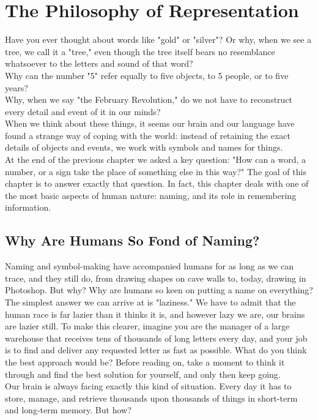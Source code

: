 \chapter{The Philosophy of Representation}
\label{ch:philosophy-of-representation}

Have you ever thought about words like "gold" or "silver"? Or why, when we see a tree, we call it a "tree," even though the tree itself bears no resemblance whatsoever to the letters and sound of that word?\\
Why can the number "5" refer equally to five objects, to 5 people, or to five years?\\
Why, when we say "the February Revolution," do we not have to reconstruct every detail and event of it in our minds?\\
When we think about these things, it seems our brain and our language have found a strange way of coping with the world: instead of retaining the exact details of objects and events, we work with symbols and names for things.\\
At the end of the previous chapter we asked a key question: "How can a word, a number, or a sign take the place of something else in this way?" The goal of this chapter is to answer exactly that question. In fact, this chapter deals with one of the most basic aspects of human nature: naming, and its role in remembering information.
\newpage
\section{Why Are Humans So Fond of Naming?}
\label{sec:why-naming}
Naming and symbol-making have accompanied humans for as long as we can trace, and they still do, from drawing shapes on cave walls to, today, drawing in Photoshop. But why? Why are humans so keen on putting a name on everything?\\
The simplest answer we can arrive at is "laziness." We have to admit that the human race is far lazier than it thinks it is, and however lazy we are, our brains are lazier still. To make this clearer, imagine you are the manager of a large warehouse that receives tens of thousands of long letters every day, and your job is to find and deliver any requested letter as fast as possible. What do you think the best approach would be? Before reading on, take a moment to think it through and find the best solution for yourself, and only then keep going.\\
Our brain is always facing exactly this kind of situation. Every day it has to store, manage, and retrieve thousands upon thousands of things in short-term and long-term memory. But how?

